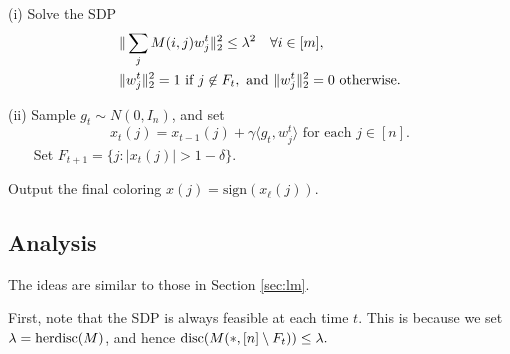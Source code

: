 (i)  Solve the SDP
 \begin{align*}
     & \|\sum_{j} M(i,j) w^t_j\|_2^2  \leq   \lambda^2 \quad \forall i\in [m],\\
     &  \|w^t_j\|_2^2  =   1   \text{ if }  j \not\in F_t,\text{ and }
   \| w^t_j\|_2^2 =  0 \text{ otherwise}. 
 \end{align*}
 

(ii) Sample $g_t \sim N(0,I_n)$, and set 
\[x_t(j) = x_{t-1}(j) + \gamma \langle g_t,w^t_j \rangle \text{ for each $j\in [n]$}.\]
\,\,\,\,\,\,\,\,\, Set $F_{t+1} = \{j: |x_t(j)| > 1-\delta\}$.

\medskip 
\noindent Output the final coloring $x(j)=\text{sign}(x_{\ell}(j))$.


\subsection{Analysis}
The ideas are similar to those in Section \ref{sec:lm}.

First, note that the SDP is always feasible at each time $t$. This is because we set $\lambda = \operatorname{herdisc}(M)$, and hence  $\operatorname{disc}(M(*,[n]\setminus F_t)) \le \lambda.$ 

